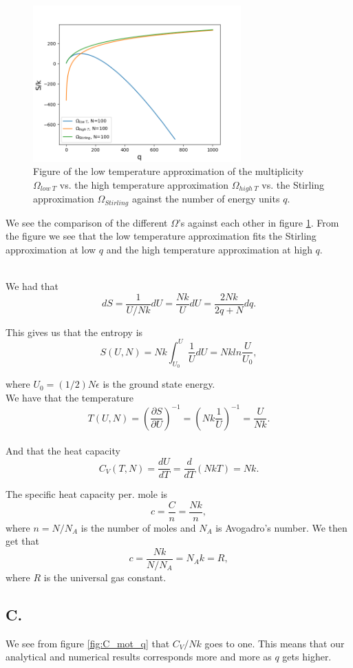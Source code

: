 \documentclass[reprint,english,notitlepage]{revtex4-1}  %
\begin{document}
\begin{figure}
\centering
\includegraphics[width=8cm]{../figures/omegas.png}
\caption{Figure of the low temperature approximation of the multiplicity $\Omega_{low\ T}$ vs. the high temperature approximation $\Omega_{high\ T}$ vs. the Stirling approximation $\Omega_{Stirling}$ against the number of energy units $q$.}
\label{fig:omegas}
\end{figure}

We see the comparison of the different $\Omega$'s against each other in figure \ref{fig:omegas}. From the figure we see that the low temperature approximation fits the Stirling approximation at low $q$ and the high temperature approximation at high $q$.

~\\
We had that $$dS=\frac{1}{U/Nk}dU=\frac{Nk}{U}dU=\frac{2Nk}{2q+N}dq.$$

This gives us that the entropy is $$S(U,N)=Nk\int_{U_0}^U \frac{1}{U}dU=Nk ln\frac{U}{U_0},$$

where $U_0=(1/2)N\epsilon$ is the ground state energy.
~\\

 We have that the temperature $$T(U,N)=(\frac{\partial S}{\partial U})^{-1}=(Nk\frac{1}{U})^{-1}=\frac{U}{Nk}.$$
 ~\\
 And that the heat capacity $$C_V(T,N)=\frac{dU}{dT}=\frac{d}{dT}(NkT)=Nk.$$

The specific heat capacity per. mole is $$ c=\frac{C}{n}=\frac{Nk}{n},$$
where $n=N/N_A$ is the number of moles and $N_A$ is Avogadro's number. We then get that 
$$ c=\frac{Nk}{N/N_A}=N_Ak=R,$$
where $R$ is the universal gas constant.

\subsection*{C.}
We see from figure \ref{fig:C_mot_q} that $C_V/Nk$ goes to one. This means that our analytical and numerical results corresponds more and more as $q$ gets higher. 
\end{document}
